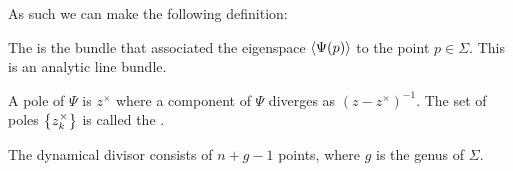 \documentclass{article}
\begin{document}
As such we can make the following definition:

\begin{definition}
	The  is the bundle that associated the eigenspace $\left\langle \Psi(p) \right\rangle$ to the point $p \in \Sigma$. This is an analytic line bundle.  
\end{definition}



\begin{definition}
A pole of $\Psi$ is $z^\times$ where a component of $\Psi$ diverges as $(z-z^\times)^{-1}$. The set of poles $\left\{ z_k^\times \right\}$ is called the . 
\end{definition}

\begin{prop}
The dynamical divisor consists of $n+g-1$ points, where $g$ is the genus of $\Sigma$. 
\end{prop}

\end{document}
